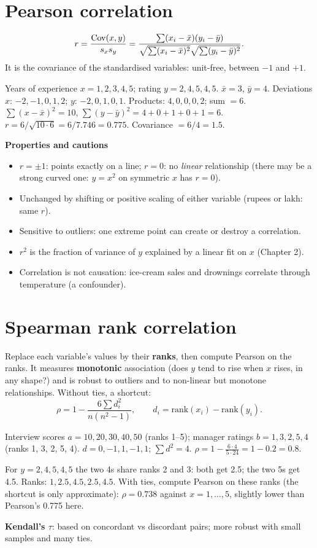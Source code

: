 \section{Pearson correlation}
\[ r = \frac{\operatorname{Cov}(x,y)}{s_xs_y} = \frac{\sum(x_i - \bar x)(y_i - \bar y)}{\sqrt{\sum(x_i - \bar x)^2}\sqrt{\sum(y_i - \bar y)^2}}. \]
It is the covariance of the standardised variables: unit-free, between $-1$ and $+1$.
\begin{example}
Years of experience $x = 1,2,3,4,5$; rating $y = 2,4,5,4,5$. $\bar x = 3$, $\bar y = 4$.
Deviations $x$: $-2,-1,0,1,2$; $y$: $-2,0,1,0,1$. Products: $4, 0, 0, 0, 2$; sum $= 6$.
$\sum(x - \bar x)^2 = 10$, $\sum(y - \bar y)^2 = 4 + 0 + 1 + 0 + 1 = 6$.
$r = 6/\sqrt{10\cdot6} = 6/7.746 = 0.775$. Covariance $= 6/4 = 1.5$.
\end{example}
\textbf{Properties and cautions}
\begin{itemize}
\item $r = \pm1$: points exactly on a line; $r = 0$: no \emph{linear} relationship (there may be a strong curved one: $y = x^2$ on symmetric $x$ has $r = 0$).
\item Unchanged by shifting or positive scaling of either variable (rupees or lakh: same $r$).
\item Sensitive to outliers: one extreme point can create or destroy a correlation.
\item $r^2$ is the fraction of variance of $y$ explained by a linear fit on $x$ (Chapter 2).
\item Correlation is not causation: ice-cream sales and drownings correlate through temperature (a confounder).
\end{itemize}

\section{Spearman rank correlation}
Replace each variable's values by their \textbf{ranks}, then compute Pearson on the ranks. It measures \textbf{monotonic} association (does $y$ tend to rise when
$x$ rises, in any shape?) and is robust to outliers and to non-linear but monotone relationships. Without ties, a shortcut:
\[ \rho = 1 - \frac{6\sum d_i^2}{n(n^2 - 1)},\qquad d_i = \text{rank}(x_i) - \text{rank}(y_i). \]
\begin{example}
Interview scores $a = 10, 20, 30, 40, 50$ (ranks 1--5); manager ratings $b = 1, 3, 2, 5, 4$ (ranks 1, 3, 2, 5, 4).
$d = 0, -1, 1, -1, 1$; $\sum d^2 = 4$. $\rho = 1 - \frac{6\cdot4}{5\cdot24} = 1 - 0.2 = 0.8$.
\end{example}
\begin{example}[: ties]
For $y = 2, 4, 5, 4, 5$ the two 4s share ranks 2 and 3: both get 2.5; the two 5s get 4.5. Ranks: $1, 2.5, 4.5, 2.5, 4.5$. With ties, compute Pearson on these ranks
(the shortcut is only approximate): $\rho = 0.738$ against $x = 1,\dots,5$, slightly lower than Pearson's 0.775 here.
\end{example}
\textbf{Kendall's $\tau$}: based on concordant vs discordant pairs; more robust with small samples and many ties.

